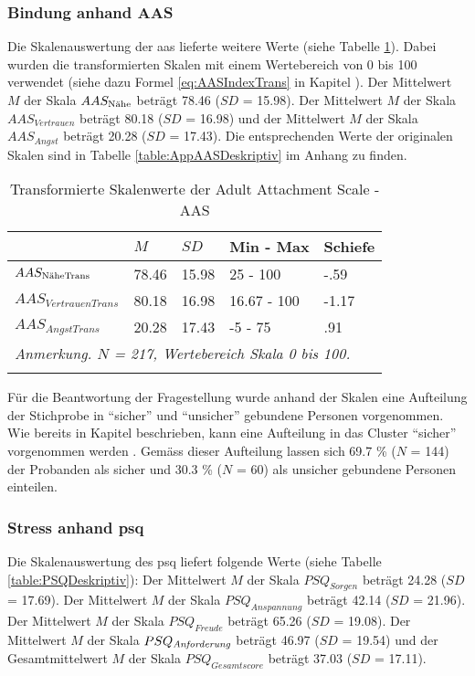 \subsubsection{Bindung anhand AAS}
Die Skalenauswertung der \acrfull{aas} lieferte weitere Werte (siehe Tabelle \ref{table:AASDeskriptivTrans}). Dabei wurden die transformierten Skalen mit einem Wertebereich von 0 bis 100 verwendet (siehe dazu Formel \ref{eq:AASIndexTrans} in Kapitel \textit{}). Der Mittelwert $M$ der Skala $AAS_{\textnormal{Nähe}}$ beträgt 78.46 ($SD$ = 15.98). Der Mittelwert $M$ der Skala $AAS_{Vertrauen}$ beträgt 80.18 ($SD$ = 16.98) und der Mittelwert  $M$ der Skala $AAS_{Angst}$ beträgt 20.28 ($SD$ = 17.43). Die entsprechenden Werte der originalen Skalen sind in Tabelle \ref{table:AppAASDeskriptiv} im Anhang zu finden.

\begin{table}%
\begin{tabular}{m{7em} m{3em}  m{3em}  m{5em} m{3em}} 
  \hline
  & $M$ & $SD$ & Min - Max & Schiefe\\
  \hline
  $AAS_{\textit{\textnormal{NäheTrans}}}$ & 78.46 & 15.98 & 25 - 100 & -.59\\
  $AAS_{VertrauenTrans}$ & 80.18 & 16.98 & 16.67 - 100 & -1.17\\
  $AAS_{AngstTrans}$ & 20.28 & 17.43 & -5 - 75 & .91 \\
  \hline
  \multicolumn{5}{l}{\textit{Anmerkung. $N$ = 217, Wertebereich Skala 0 bis 100.}}\\
  &&&&\\
\end{tabular}
\caption{Transformierte Skalenwerte der Adult Attachment Scale - AAS}
\label{table:AASDeskriptivTrans}
\end{table}

Für die Beantwortung der Fragestellung wurde anhand der Skalen eine Aufteilung der Stichprobe in \enquote{sicher} und \enquote{unsicher} gebundene Personen vorgenommen. Wie bereits in Kapitel \textit{} beschrieben, kann eine Aufteilung in das Cluster \enquote{sicher} vorgenommen werden \cite{Schuetzmann2004}. Gemäss dieser Aufteilung lassen sich 69.7 \% ($N$ = 144) der Probanden als sicher und 30.3 \% ($N$ = 60) als unsicher gebundene Personen einteilen. 

\subsubsection{Stress anhand \acrshort{psq}}
Die Skalenauswertung des \acrfull{psq} liefert folgende Werte (siehe Tabelle \ref{table:PSQDeskriptiv}): Der Mittelwert $M$ der Skala $PSQ_{Sorgen}$ beträgt 24.28 ($SD$ = 17.69). Der Mittelwert $M$ der Skala $PSQ_{Anspannung}$ beträgt 42.14 ($SD$ = 21.96). Der Mittelwert $M$ der Skala $PSQ_{Freude}$ beträgt 65.26 ($SD$ = 19.08). Der Mittelwert $M$ der Skala $PSQ_{\text{\textit{Anforderung}}}$ beträgt 46.97 ($SD$ = 19.54) und der Gesamtmittelwert $M$ der Skala $PSQ_{Gesamtscore}$ beträgt 37.03 ($SD$ = 17.11).

